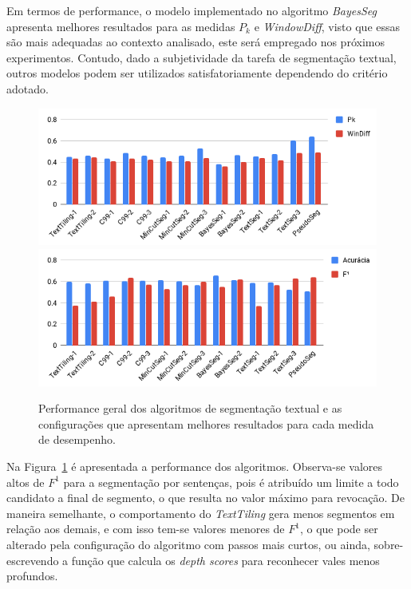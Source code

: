 Em termos de performance, o modelo implementado no algoritmo \textit{BayesSeg} apresenta melhores resultados para as medidas $P_k$ e \textit{WindowDiff}, visto que essas são mais adequadas ao contexto analisado, este será empregado nos próximos experimentos. Contudo, dado a subjetividade da tarefa de segmentação textual, outros modelos podem ser utilizados satisfatoriamente dependendo do critério adotado. 


\begin{figure}[!ht] \centering     %

		\includegraphics[width=.82\textwidth]{conteudo/capitulos/figs/graficos/resumo-wd-pk.png}	
		\label{fig:resumo-wd-pka}
		\includegraphics[width=.82\textwidth]{conteudo/capitulos/figs/graficos/resumo-tradicionais.png}	
		\label{fig:resumo-tradicionaisa}
	\caption{Performance geral dos algoritmos de segmentação textual e as configurações que apresentam melhores resultados para cada medida de desempenho.}
	\label{fig:resumo-segmentadores}
\end{figure}




Na Figura~\ref{fig:resumo-segmentadores} é apresentada a performance dos algoritmos.
Observa-se valores altos de $F^1$ para a segmentação por sentenças, pois é atribuído um limite a todo candidato a final de segmento, o que resulta no valor máximo para revocação. De maneira semelhante, o comportamento do \textit{TextTiling} gera menos segmentos em relação aos demais, e com isso tem-se valores menores de $F^1$, o que pode ser alterado pela configuração do algoritmo com passos mais curtos, ou ainda, sobre-escrevendo a função que calcula os \textit{depth scores} para reconhecer vales menos profundos.



